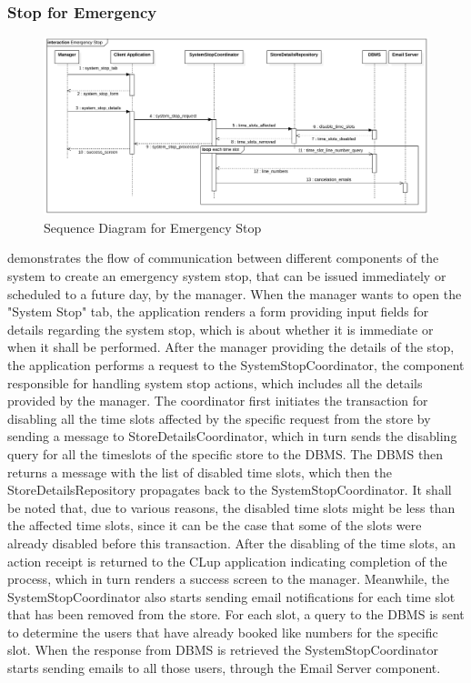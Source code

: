 \subsubsection{Stop for Emergency}
\begin{figure}[H]
    \centering
    \includegraphics[height=0.4\textwidth]{Images/SequenceDiagrams/EmergencyStop.png}
    \caption{Sequence Diagram for Emergency Stop}
    \label{fig:SDEmergencyStop}
\end{figure}
 demonstrates the flow of communication between different components of the system to create an emergency system stop, that can be issued immediately or scheduled to a future day, by the manager.
When the manager wants to open the "System Stop" tab, the application renders a form providing input fields for details regarding the system stop, which is about whether it is immediate or when it shall be performed.
After the manager providing the details of the stop, the application performs a request to the SystemStopCoordinator, the component responsible for handling system stop actions, which includes all the details provided by the manager.
The coordinator first initiates the transaction for disabling all the time slots affected by the specific request from the store by sending a message to StoreDetailsCoordinator, which in turn sends the disabling query for all the timeslots of the specific store to the DBMS.
The DBMS then returns a message with the list of disabled time slots, which then the StoreDetailsRepository propagates back to the SystemStopCoordinator.
It shall be noted that, due to various reasons, the disabled time slots might be less than the affected time slots, since it can be the case that some of the slots were already disabled before this transaction.
After the disabling of the time slots, an action receipt is returned to the CLup application indicating completion of the process, which in turn renders a success screen to the manager.
Meanwhile, the SystemStopCoordinator also starts sending email notifications for each time slot that has been removed from the store.
For each slot, a query to the DBMS is sent to determine the users that have already booked like numbers for the specific slot.
When the response from DBMS is retrieved the SystemStopCoordinator starts sending emails to all those users, through the Email Server component.

